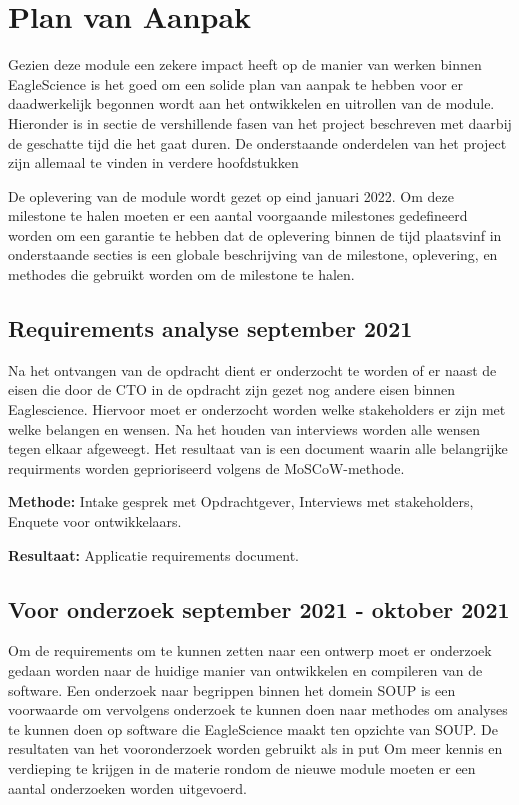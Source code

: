 
\chapter{Plan van Aanpak}\label{ch:planvanaanpak} %


Gezien deze module een zekere impact heeft op de manier van werken binnen EagleScience is het goed om een solide plan van aanpak te hebben voor er daadwerkelijk begonnen wordt aan het ontwikkelen en uitrollen van de module. Hieronder is in sectie de vershillende fasen van het project beschreven met daarbij de geschatte tijd die het gaat duren. De onderstaande onderdelen van het project zijn allemaal te vinden in verdere hoofdstukken

De oplevering van de module wordt gezet op eind januari 2022. Om deze milestone te halen moeten er een aantal voorgaande milestones gedefineerd worden om een garantie te hebben dat de oplevering binnen de tijd plaatsvinf in onderstaande secties is een globale beschrijving van de milestone, oplevering, en methodes die gebruikt worden om de milestone te halen.

\section{Requirements analyse \textbf{september 2021}}\label{sec:requirements-analyse}
Na het ontvangen van de opdracht dient er onderzocht te worden of er naast de eisen die door de CTO in de opdracht zijn gezet nog andere eisen binnen Eaglescience. Hiervoor moet er onderzocht worden welke stakeholders er zijn met welke belangen en wensen. Na het houden van interviews worden alle wensen tegen elkaar afgeweegt. Het resultaat van is een document waarin alle belangrijke requirments worden geprioriseerd volgens de MoSCoW-methode.

\textbf{Methode:} Intake gesprek met Opdrachtgever, Interviews met stakeholders, Enquete voor ontwikkelaars.

\textbf{Resultaat:} Applicatie requirements document. %

\section{Voor onderzoek \textbf{september 2021 - oktober 2021 }}\label{sec:onderzoek}
Om de requirements om te kunnen zetten naar een ontwerp moet er onderzoek gedaan worden naar de huidige manier van ontwikkelen en compileren van de software. Een onderzoek naar begrippen binnen het domein SOUP is een voorwaarde om vervolgens onderzoek te kunnen doen naar methodes om analyses te kunnen doen op software die EagleScience maakt ten opzichte van SOUP. De resultaten van het vooronderzoek worden gebruikt als in put
Om meer kennis en verdieping te krijgen in de materie rondom de nieuwe module moeten er een aantal onderzoeken worden uitgevoerd.


